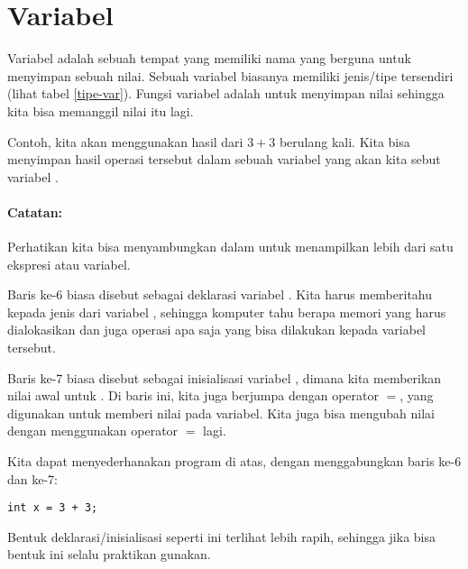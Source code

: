 \documentclass[../main.tex]{subfiles}
\begin{document}
\section{Variabel}
Variabel adalah sebuah tempat yang memiliki nama yang berguna untuk menyimpan
sebuah nilai. Sebuah variabel biasanya memiliki jenis\slash{}tipe tersendiri
(lihat tabel \ref{tipe-var}). Fungsi variabel adalah untuk menyimpan nilai
sehingga kita bisa memanggil nilai itu lagi.

Contoh, kita akan menggunakan hasil dari \(3+3\) berulang kali. Kita bisa
menyimpan hasil operasi tersebut dalam sebuah variabel yang akan kita sebut
variabel .


\paragraph{Catatan:}
Perhatikan kita bisa menyambungkan \code{<<} dalam  untuk menampilkan
lebih dari satu ekspresi atau variabel.

Baris ke-6 biasa disebut sebagai deklarasi variabel . Kita harus
memberitahu kepada  jenis dari variabel ,
sehingga komputer tahu berapa memori yang harus dialokasikan dan juga operasi
apa saja yang bisa dilakukan kepada variabel tersebut.

Baris ke-7 biasa disebut sebagai inisialisasi variabel , dimana kita
memberikan nilai awal untuk . Di baris ini, kita juga berjumpa dengan
operator \(=\), yang digunakan untuk memberi nilai pada variabel. Kita juga bisa
mengubah nilai  dengan menggunakan operator \(=\) lagi.

Kita dapat menyederhanakan program di atas, dengan menggabungkan baris ke-6 dan
ke-7:
\begin{verbatim}
int x = 3 + 3;
\end{verbatim}

Bentuk deklarasi\slash{}inisialisasi seperti ini terlihat lebih rapih, sehingga
jika bisa bentuk ini selalu praktikan gunakan.
\end{document}
